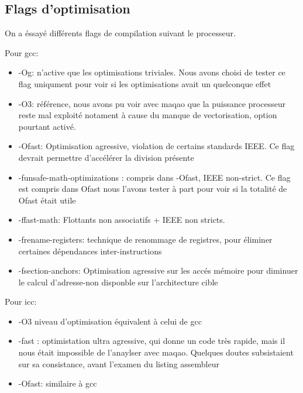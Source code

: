\documentclass{report}
\begin{document}
\subsection*{Flags d'optimisation}

On a éssayé différents flags de compilation suivant le processeur.

Pour gcc:
\begin{itemize}
    \item{-Og: n'active que les optimisations triviales. Nous avons choisi de tester ce flag uniqument pour voir si les optimisations avait un quelconque effet}
    \item{-O3: référence, nous avons pu voir avec maqao que la puissance processeur reste mal exploité notament à cause du manque de vectorisation, option pourtant activé.}
    \item{-Ofast: Optimisation agressive, violation de certains standards IEEE. Ce flag devrait permettre d'accélérer la division présente }
    \item{-funsafe-math-optimizations : compris dans -Ofast, IEEE non-strict. Ce flag est compris dans Ofast nous l'avons tester à part pour voir si la totalité de Ofast était utile }
    \item{-ffast-math: Flottants non associatifs + IEEE non stricts.}
    \item{-frename-registers: technique de renommage de registres, pour éliminer certaines dépendances inter-instructions}
    \item{-fsection-anchors: Optimisation agressive sur les accés mémoire pour diminuer le calcul d'adresse-non disponble sur l'architecture cible}
\end{itemize}

Pour icc:
\begin{itemize}
    \item{-O3 niveau d'optimisation équivalent à celui de gcc}
    \item{-fast : optimistation ultra agressive, qui donne un code très rapide, mais il nous était impossible de l'anaylser avec maqao. Quelques doutes subsistaient sur sa consistance, avant l'examen du listing assembleur}
    \item {-Ofast: similaire à gcc}
\end{itemize}
\end{document}
